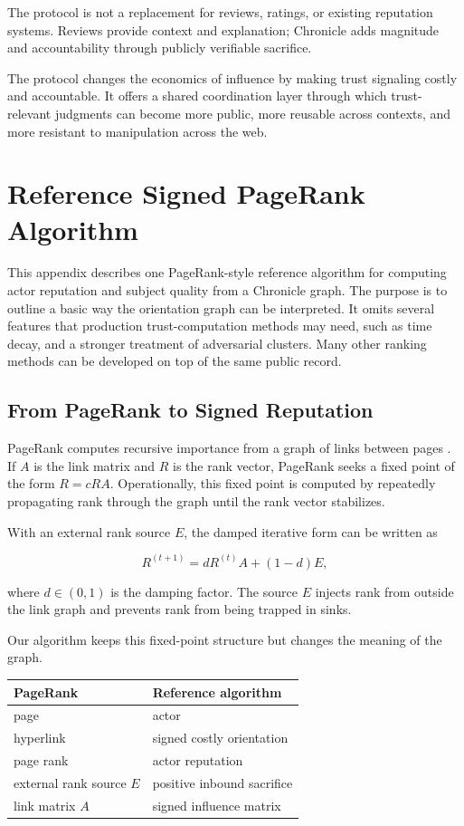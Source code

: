 \documentclass[11pt]{article}
\begin{document}
The protocol is not a replacement for reviews, ratings, or existing reputation systems. Reviews provide context and explanation; Chronicle adds magnitude and accountability through publicly verifiable sacrifice. 

The protocol changes the economics of influence by making trust signaling costly and accountable. It offers a shared coordination layer through which trust-relevant judgments can become more public, more reusable across contexts, and more resistant to manipulation across the web.

\appendix

\section{Reference Signed PageRank Algorithm}

This appendix describes one PageRank-style reference algorithm for computing actor reputation and subject quality from a Chronicle graph. The purpose is to outline a basic way the orientation graph can be interpreted. It omits several features that production trust-computation methods may need, such as time decay, and a stronger treatment of adversarial clusters. Many other ranking methods can be developed on top of the same public record.

\subsection{From PageRank to Signed Reputation}

PageRank computes recursive importance from a graph of links between pages \cite{page1999pagerank}. If \(A\) is the link matrix and \(R\) is the rank vector, PageRank seeks a fixed point of the form \(R = cRA\). Operationally, this fixed point is computed by repeatedly propagating rank through the graph until the rank vector stabilizes.

With an external rank source \(E\), the damped iterative form can be written as

\[
R^{(t+1)} = dR^{(t)}A + (1-d)E,
\]

where \(d \in (0,1)\) is the damping factor. The source \(E\) injects rank from outside the link graph and prevents rank from being trapped in sinks.

Our algorithm keeps this fixed-point structure but changes the meaning of the graph.

\begin{table}[h]
\centering
\begin{tabular}{ll}
\hline
\textbf{PageRank} & \textbf{Reference algorithm} \\
\hline
page & actor \\
hyperlink & signed costly orientation \\
page rank & actor reputation \\
external rank source \(E\) & positive inbound sacrifice \\
link matrix \(A\) & signed influence matrix \\
\hline
\end{tabular}
\end{table}
\end{document}
